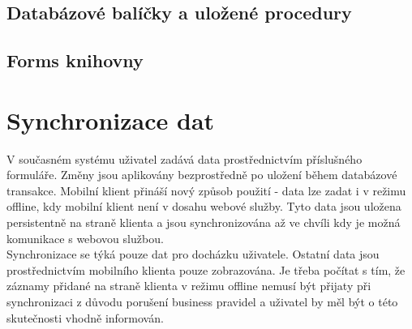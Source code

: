 \documentclass{bakalarka}
\begin{document}
\subsection{Databázové balíčky a uložené procedury}

\subsection{Forms knihovny}

\section{Synchronizace dat}
V současném systému uživatel zadává data prostřednictvím příslušného formuláře. Změny jsou aplikovány bezprostředně po uložení během databázové transakce. Mobilní klient přináší nový způsob použití - data lze zadat i v režimu offline, kdy mobilní klient není v dosahu webové služby. Tyto data jsou uložena persistentně na straně klienta a jsou synchronizována až ve chvíli kdy je možná komunikace s webovou službou.\\ \indent
Synchronizace se týká pouze dat pro docházku uživatele. Ostatní data jsou prostřednictvím mobilního klienta pouze zobrazována. Je třeba počítat s tím, že záznamy přidané na straně klienta v režimu offline nemusí být přijaty při synchronizaci z důvodu porušení business pravidel a uživatel by měl být o této skutečnosti vhodně informován.
\end{document}
